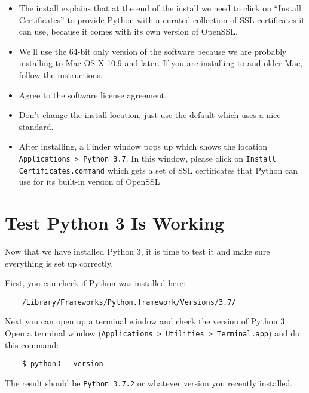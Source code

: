 \begin{itemize}

\item The install explains that at the end of the install we need
  to click on ``Install Certificates'' to provide Python with a
  curated collection of SSL certificates it can use, because it comes
  with its own version of OpenSSL.

\item We'll use the 64-bit only version of the software because
  we are probably installing to Mac OS X 10.9 and later. If you are
  installing to and older Mac, follow the instructions.

\item Agree to the software license agreement.

\item Don't change the install location, just use the default which
  uses a nice standard.

\item After installing, a Finder window pops up which shows the
  location \texttt{Applications > Python 3.7}. In this window, please
  click on \texttt{Install Certificates.command} which gets a set of
  SSL certificates that Python can use for its built-in version
  of OpenSSL

\end{itemize}

\section{Test Python 3 Is Working}

Now that we have installed Python 3, it is time to test it and
make sure everything is set up correctly.

First, you can check if Python was installed here:

\begin{verbatim}
    /Library/Frameworks/Python.framework/Versions/3.7/
\end{verbatim}

Next you can open up a terminal window and check the version
of Python 3. Open a terminal window (\texttt{Applications > Utilities > Terminal.app})
and do this command:

\begin{verbatim}
    $ python3 --version
\end{verbatim}

The result should be \texttt{Python 3.7.2} or whatever version
you recently installed.

